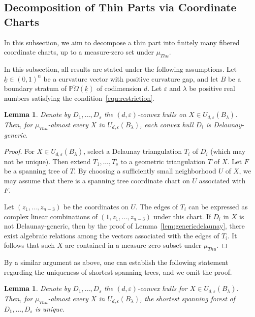 \documentclass{compositio}
\numberwithin{equation}{section}
\numberwithin{figure}{section}
\theoremstyle{definition}
\theoremstyle{plain}
\newtheorem{lemma}[definition]{Lemma}
\begin{document}
{\subsection{Decomposition of Thin Parts via Coordinate Charts}\label{sec:goodcoordinate}
In this subsection, we aim to decompose a thin part into finitely many fibered coordinate charts, up to a measure-zero set under $\mu_{Thu}$.

In this subsection, all results are stated under the following assumptions. Let $\underline{k} \in (0,1)^n$ be a curvature vector with positive curvature gap, and let $B$ be a boundary stratum of $\overline{\mathbb{P}\Omega}(\underline{k})$ of codimension $d$. Let $\varepsilon$ and $\lambda$ be positive real numbers satisfying the condition~\eqref{equ:restriction}.

\begin{lemma}\label{lem:genericdelaunayinfinitecase}
Denote by $D_1, \ldots, D_s$ the $(d,\varepsilon)$-convex hulls on $X \in U_{d,\varepsilon}(B_\lambda)$. Then, for $\mu_{Thu}$-almost every $X$ in $U_{d,\varepsilon}(B_{\lambda})$, each convex hull $D_i$ is Delaunay-generic.
\end{lemma}

\begin{proof}
    For $X \in U_{d,\varepsilon}(B_\lambda)$, select a Delaunay triangulation $T_i$ of $D_i$ (which may not be unique). Then extend $T_1, \ldots, T_s$ to a geometric triangulation $T$ of $X$. Let $F$ be a spanning tree of $T$. By choosing a sufficiently small neighborhood $U$ of $X$, we may assume that there is a spanning tree coordinate chart on $U$ associated with $F$. 
    
    Let $(z_1, \ldots, z_{n-3})$ be the coordinates on $U$. The edges of $T_i$ can be expressed as complex linear combinations of $(1, z_1, \ldots, z_{n-3})$ under this chart. If $D_i$ in $X$ is not Delaunay-generic, then by the proof of Lemma~\ref{lem:genericdelaunay}, there exist algebraic relations among the vectors associated with the edges of $T_i$. It follows that such $X$ are contained in a measure zero subset under $\mu_{Thu}$.
\end{proof}

By a similar argument as above, one can establish the following statement regarding the uniqueness of shortest spanning trees, and we omit the proof.

\begin{lemma}\label{lem:uniqueshortestspanningforest}
    Denote by $D_1, \ldots, D_s$ the $(d,\varepsilon)$-convex hulls for $X \in U_{d,\varepsilon}(B_\lambda)$. Then, for $\mu_{Thu}$-almost every $X$ in $U_{d,\varepsilon}(B_{\lambda})$, the shortest spanning forest of $D_1, \ldots, D_s$ is unique.
\end{lemma}

}
\end{document}
